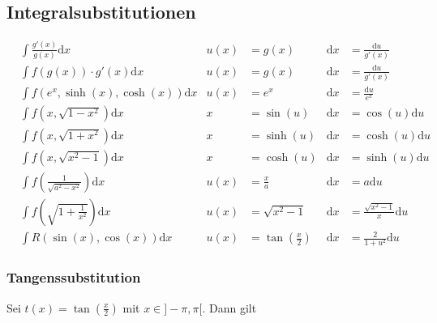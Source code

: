 \documentclass[a4paper, fontsize = 8pt, landscape]{scrartcl}
\begin{document}
\begin{multicols*}{3}
    \subsection{Integralsubstitutionen}
    \begin{small}
        \begin{align*}
             & \int \frac{g'(x)}{g(x)}\text{d}x                     & u(x) & =g(x)                         & \text{d}x & =\frac{\text{d}u}{g'(x)}          \\
             & \int f(g(x))\cdot g'(x)\text{d}x                     & u(x) & =g(x)                         & \text{d}x & =\frac{\text{d}u}{g'(x)}          \\
             & \int f(e^x, \sinh(x), \cosh(x))\text{d}x             & u(x) & =e^x                          & \text{d}x & =\frac{\text{d}u}{e^x}            \\
             & \int f(x, \sqrt{1-x^2})\text{d}x                     & x    & =\sin(u)                      & \text{d}x & =\cos(u)\text{d}u                 \\
             & \int f(x, \sqrt{1+x^2})\text{d}x                     & x    & =\sinh(u)                     & \text{d}x & =\cosh(u)\text{d}u                \\
             & \int f(x, \sqrt{x^2-1})\text{d}x                     & x    & =\cosh(u)                     & \text{d}x & =\sinh(u)\text{d}u                \\
             & \int f\left(\frac{1}{\sqrt{a^2-x^2}}\right)\text{d}x & u(x) & =\frac{x}{a}                  & \text{d}x & =a\text{d}u                       \\
             & \int f\left(\sqrt{1+\frac{1}{x^2}}\right)\text{d}x   & u(x) & =\sqrt{x^2-1}                 & \text{d}x & =\frac{\sqrt{x^2-1}}{x} \text{d}u \\
             & \int R(\sin(x), \cos(x))\text{d}x                    & u(x) & =\tan\left(\frac{x}{2}\right) & \text{d}x & =\frac{2}{1+u^2}\text{d}u
        \end{align*}
        \subsubsection*{Tangenssubstitution}

        Sei $t(x) = \tan(\frac{x}{2})$ mit $x \in ]-\pi, \pi[$. Dann gilt


\end{small}
\end{multicols*}
\end{document}
